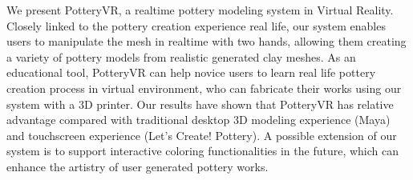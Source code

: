We present PotteryVR, a realtime pottery modeling system in Virtual Reality.
Closely linked to the pottery creation experience real life, our system enables users to manipulate the mesh in realtime with two hands, allowing them creating a variety of pottery models from realistic generated clay meshes.
As an educational tool, PotteryVR can help novice users to learn real life pottery creation process in virtual environment, who can fabricate their works using our system with a 3D printer.
Our results have shown that PotteryVR has relative advantage compared with traditional desktop 3D modeling experience (Maya) and touchscreen experience (Let's Create! Pottery).
A possible extension of our system is to support interactive coloring functionalities in the future, which can enhance the artistry of user generated pottery works.


\begin{acknowledgements}
\end{acknowledgements}


%
%



